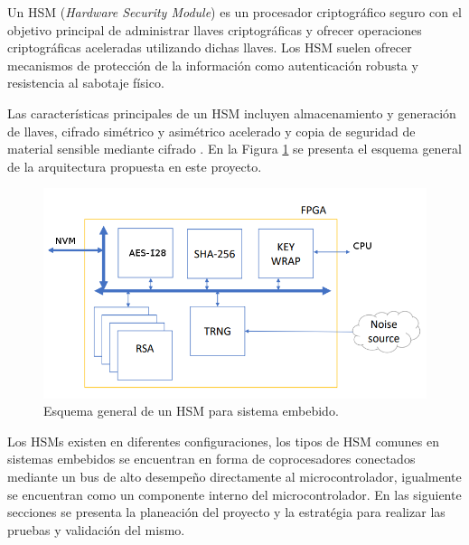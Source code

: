 \documentclass[a4paper]{article}
\begin{document}
Un HSM (\textit{Hardware Security Module}) es un procesador criptográfico seguro con el objetivo principal de administrar llaves criptográficas y ofrecer operaciones criptográficas aceleradas utilizando dichas llaves. Los HSM suelen ofrecer mecanismos de protección de la información como autenticación robusta y resistencia al sabotaje físico.

Las características principales de un HSM incluyen almacenamiento y generación de llaves, cifrado simétrico y asimétrico acelerado y copia de seguridad de material sensible mediante cifrado \cite{mtreviewhsm:2010,std-fips-140-2:2005}. En la Figura \ref{fig:hsm_general} se presenta el esquema general de la arquitectura propuesta en este proyecto.
 
\begin{figure}[h]
  \centering
  \includegraphics[width=0.8\linewidth]{pictures/hsm_architecture.png}
  \caption{Esquema general de un HSM para sistema embebido.}
  \label{fig:hsm_general}
\end{figure}

Los HSMs existen en diferentes configuraciones, los tipos de HSM comunes en sistemas embebidos se encuentran en forma de coprocesadores conectados mediante un bus de alto desempeño directamente al microcontrolador, igualmente se encuentran como un componente interno del microcontrolador. En las siguiente secciones se presenta la planeación del proyecto y la estratégia para realizar las pruebas y validación del mismo.
\end{document}

